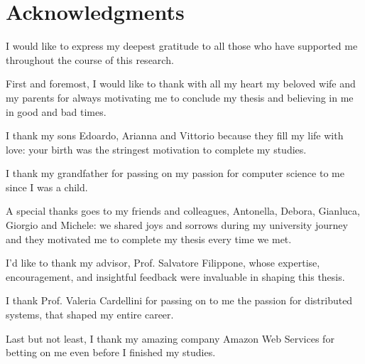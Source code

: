 


\chapter*{Acknowledgments}

I would like to express my deepest gratitude to all those who have supported me throughout the course of this research.

First and foremost, I would like to thank with all my heart my beloved wife and my parents for always motivating me to conclude my thesis and believing in me in good and bad times.

I thank my sons Edoardo, Arianna and Vittorio because they fill my life with love: your birth was the stringest motivation to complete my studies.

I thank my grandfather for passing on my passion for computer science to me since I was a child.

A special thanks goes to my friends and colleagues, Antonella, Debora, Gianluca, Giorgio and Michele: we shared joys and sorrows during my university journey and they motivated me to complete my thesis every time we met.

I'd like to thank my advisor, Prof. Salvatore Filippone, whose expertise, encouragement, and insightful feedback were invaluable in shaping this thesis.

I thank Prof. Valeria Cardellini for passing on to me the passion for distributed systems, that shaped my entire career.

Last but not least, I thank my amazing company Amazon Web Services for betting on me even before I finished my studies.

